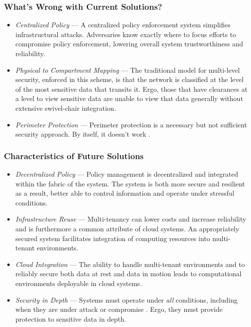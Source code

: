 \begin{frame}
\frametitle{What's Wrong with Current Solutions?}
\begin{itemize}
\item<2-> \textit{Centralized Policy} --- A centralized policy enforcement system simplifies infrastructural attacks.  Adversaries know exactly where to focus efforts to compromise policy enforcement, lowering overall system trustworthiness and reliability. 
\item<3-> \textit{Physical to Compartment Mapping} --- The traditional model for multi-level security, enforced in this scheme, is that the network is classified at the level of the most sensitive data that transits it.  Ergo, those that have clearances at a level to view sensitive data are unable to view that data generally without extensive swivel-chair integration.
\item<4-> \textit{Perimeter Protection} --- Perimeter protection is a necessary but not sufficient security approach.  By itself, it doesn't work \cite{proposal:ron-ross}.
\end{itemize}
\end{frame}

\begin{frame}
\frametitle{Characteristics of Future Solutions}
\begin{itemize}
\item<2-> \textit{Decentralized Policy} --- Policy management is decentralized and integrated within the fabric of the system.  The system is both more secure and resilient as a result, better able to control information and operate under stressful conditions.
\item<3-> \textit{Infrastructure Reuse} --- Multi-tenancy can lower costs and increase reliability and is furthermore a common attribute of cloud systems.  An appropriately secured system facilitates integration of computing resources into multi-tenant environments.
\item<4-> \textit{Cloud Integration} --- The ability to handle multi-tenant environments and to reliably secure both data at rest and data in motion leads to computational environments deployable in cloud systems.
\item<5-> \textit{Security in Depth} --- Systems must operate under \textit{all} conditions, including when they are under attack or compromise \cite{proposal:ron-ross}.  Ergo, they must provide protection to sensitive data in depth.
\end{itemize}
\end{frame}
